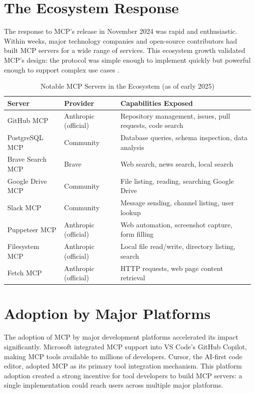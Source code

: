 \section{The Ecosystem Response}
The response to MCP's release in November 2024 was rapid and enthusiastic. Within weeks, major technology companies and open-source contributors had built MCP servers for a wide range of services. This ecosystem growth validated MCP's design: the protocol was simple enough to implement quickly but powerful enough to support complex use cases \cite{anthropic2024mcp}.

\begin{table}[H]
    \centering
    \caption{Notable MCP Servers in the Ecosystem (as of early 2025)}
    \label{tab:mcp_ecosystem}
    \begin{tabular}{|>{\raggedright\arraybackslash}p{3.0cm}|>{\raggedright\arraybackslash}p{3.5cm}|>{\raggedright\arraybackslash}p{6.0cm}|}
        \hline
        \textbf{Server} & \textbf{Provider} & \textbf{Capabilities Exposed} \\ \hline
        GitHub MCP & Anthropic (official) & Repository management, issues, pull requests, code search \\ \hline
        PostgreSQL MCP & Community & Database queries, schema inspection, data analysis \\ \hline
        Brave Search MCP & Brave & Web search, news search, local search \\ \hline
        Google Drive MCP & Community & File listing, reading, searching Google Drive \\ \hline
        Slack MCP & Community & Message sending, channel listing, user lookup \\ \hline
        Puppeteer MCP & Anthropic (official) & Web automation, screenshot capture, form filling \\ \hline
        Filesystem MCP & Anthropic (official) & Local file read/write, directory listing, search \\ \hline
        Fetch MCP & Anthropic (official) & HTTP requests, web page content retrieval \\ \hline
    \end{tabular}
\end{table}

\section{Adoption by Major Platforms}
The adoption of MCP by major development platforms accelerated its impact significantly. Microsoft integrated MCP support into VS Code's GitHub Copilot, making MCP tools available to millions of developers. Cursor, the AI-first code editor, adopted MCP as its primary tool integration mechanism. This platform adoption created a strong incentive for tool developers to build MCP servers: a single implementation could reach users across multiple major platforms.

